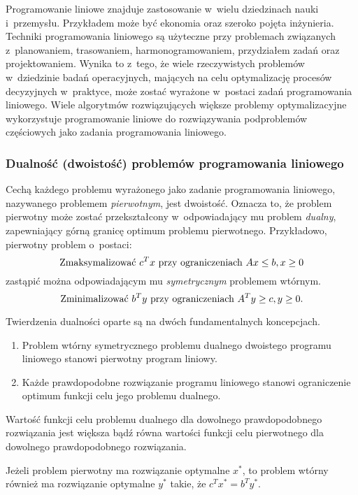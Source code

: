 \par{
  Programowanie liniowe znajduje zastosowanie w~wielu dziedzinach nauki i~przemysłu. 
  Przykładem może być ekonomia oraz szeroko pojęta inżynieria.
  Techniki programowania liniowego są użyteczne przy problemach związanych 
  z~planowaniem, trasowaniem, harmonogramowaniem, przydziałem zadań oraz
  projektowaniem.
  Wynika to z~tego, że wiele rzeczywistych problemów w~dziedzinie badań
  operacyjnych, mających na celu optymalizację procesów decyzyjnych w~praktyce,
  może zostać wyrażone w~postaci zadań programowania liniowego.
  Wiele algorytmów rozwiązujących większe problemy optymalizacyjne wykorzystuje
  programowanie liniowe do rozwiązywania podproblemów częściowych jako zadania 
  programowania liniowego.
}
\subsubsection{\textbf{Dualność (dwoistość) problemów programowania liniowego}}
\label{sss_lp_duality}
\par{
  Cechą każdego problemu wyrażonego jako zadanie programowania liniowego,
  nazywanego problemem \emph{pierwotnym}, jest dwoistość.
  Oznacza to, że problem pierwotny może zostać przekształcony w~odpowiadający mu
  problem \emph{dualny}, zapewniający górną granicę optimum problemu
  pierwotnego. 
  Przykładowo, pierwotny problem o~postaci:\[
  \textnormal{Zmaksymalizować $c^{T}x$ przy ograniczeniach $Ax\leq b, x \geq 0$}
  \]
  zastąpić można odpowiadającym mu \emph{symetrycznym} problemem wtórnym.
  \[
  \textnormal{Zminimalizować $b^{T}y$ przy ograniczeniach $A^{T}y \geq c, y \geq 0$.}
  \]
}
\par{
  Twierdzenia dualności oparte są na dwóch fundamentalnych koncepcjach.
  \begin{enumerate}
    \item Problem wtórny symetrycznego problemu dualnego dwoistego programu
      liniowego stanowi pierwotny program liniowy.
    \item Każde prawdopodobne rozwiązanie programu liniowego stanowi
      ograniczenie optimum funkcji celu jego problemu dualnego.
  \end{enumerate}

  \begin{theorem}
    Wartość funkcji celu problemu dualnego dla dowolnego prawdopodobnego
    rozwiązania jest większa bądź równa wartości funkcji celu pierwotnego dla
    dowolnego prawdopodobnego rozwiązania.
  \end{theorem}
  \begin{theorem}
    Jeżeli problem pierwotny ma rozwiązanie optymalne $x^*$, to problem 
    wtórny również ma rozwiązanie optymalne $y^*$ takie, że $c^{T}x^*=b^{T}y^*$.
  \end{theorem}
}

